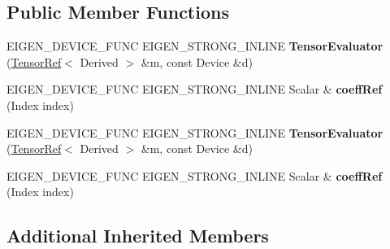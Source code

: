 \subsection*{Public Member Functions}
\begin{DoxyCompactItemize}
\item 
\mbox{\label{struct_eigen_1_1_tensor_evaluator_3_01_tensor_ref_3_01_derived_01_4_00_01_device_01_4_ad13de5092fe4c78fbfa0f152d3a2b9a3}} 
E\+I\+G\+E\+N\+\_\+\+D\+E\+V\+I\+C\+E\+\_\+\+F\+U\+NC E\+I\+G\+E\+N\+\_\+\+S\+T\+R\+O\+N\+G\+\_\+\+I\+N\+L\+I\+NE {\bfseries Tensor\+Evaluator} (\hyperlink{class_eigen_1_1_tensor_ref}{Tensor\+Ref}$<$ Derived $>$ \&m, const Device \&d)
\item 
\mbox{\label{struct_eigen_1_1_tensor_evaluator_3_01_tensor_ref_3_01_derived_01_4_00_01_device_01_4_a89feb2d5a787e287879f94f1163fa464}} 
E\+I\+G\+E\+N\+\_\+\+D\+E\+V\+I\+C\+E\+\_\+\+F\+U\+NC E\+I\+G\+E\+N\+\_\+\+S\+T\+R\+O\+N\+G\+\_\+\+I\+N\+L\+I\+NE Scalar \& {\bfseries coeff\+Ref} (Index index)
\item 
\mbox{\label{struct_eigen_1_1_tensor_evaluator_3_01_tensor_ref_3_01_derived_01_4_00_01_device_01_4_ad13de5092fe4c78fbfa0f152d3a2b9a3}} 
E\+I\+G\+E\+N\+\_\+\+D\+E\+V\+I\+C\+E\+\_\+\+F\+U\+NC E\+I\+G\+E\+N\+\_\+\+S\+T\+R\+O\+N\+G\+\_\+\+I\+N\+L\+I\+NE {\bfseries Tensor\+Evaluator} (\hyperlink{class_eigen_1_1_tensor_ref}{Tensor\+Ref}$<$ Derived $>$ \&m, const Device \&d)
\item 
\mbox{\label{struct_eigen_1_1_tensor_evaluator_3_01_tensor_ref_3_01_derived_01_4_00_01_device_01_4_a89feb2d5a787e287879f94f1163fa464}} 
E\+I\+G\+E\+N\+\_\+\+D\+E\+V\+I\+C\+E\+\_\+\+F\+U\+NC E\+I\+G\+E\+N\+\_\+\+S\+T\+R\+O\+N\+G\+\_\+\+I\+N\+L\+I\+NE Scalar \& {\bfseries coeff\+Ref} (Index index)
\end{DoxyCompactItemize}
\subsection*{Additional Inherited Members}


